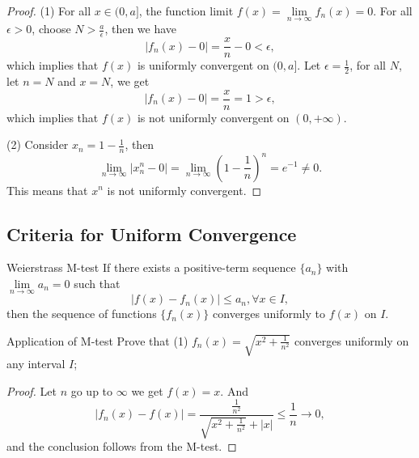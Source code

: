 \begin{proof}
  (1) For all $x \in (0, a]$, the function limit $f(x) = \lim \limits _{n
    \rightarrow \infty} f_n(x) = 0$. For all $\epsilon > 0$, choose $N >
  \frac{a}{\epsilon}$,
  then we have
  \begin{equation}
    |f_n(x) - 0| = \frac{x}{n} - 0 < \epsilon,
  \end{equation}
  which implies that $f(x)$ is uniformly convergent on $(0, a]$.
  Let $\epsilon = \frac{1}{2}$, for all $N$, let $n = N$ and $x = N$,
  we get
  \begin{equation}
    |f_n(x) - 0| = \frac{x}{n} = 1 > \epsilon,
  \end{equation}
  which implies that $f(x)$ is not uniformly convergent on $(0, +\infty)$.

  (2) Consider $x_n = 1 - \frac{1}{n}$, then
  \begin{equation}
    \lim \limits _{n \rightarrow \infty} |x_n^n - 0|
    = \lim \limits _{n \rightarrow \infty} (1 - \frac{1}{n})^n = e^{-1} \neq 0.
  \end{equation}
  This means that $x^n$ is not uniformly convergent.
\end{proof}

\subsection{Criteria for Uniform Convergence}

\begin{theorem}{Weierstrass M-test}{}
  If there exists a positive-term sequence $\{a_n\}$
  with $\lim \limits _{n \rightarrow \infty} a_n = 0$ such that
  \begin{equation}
    |f(x) - f_n(x)| \leq a_n, \forall x \in I,
  \end{equation}
  then the sequence of functions $\{f_n(x)\}$ converges uniformly to $f(x)$ on $I$.
\end{theorem}

\begin{example}{Application of M-test}{}
  Prove that
  (1) $f_n(x) = \sqrt{x^2 + \frac{1}{n^2}}$ converges uniformly on any interval $I$;
\end{example}

\begin{proof}
  Let $n$ go up to $\infty$ we get $f(x) = x$.
  And
  \begin{equation}
    |f_n(x) - f(x)| = \frac{\frac{1}{n^2}}{\sqrt{x^2 + \frac{1}{n^2}} + |x|} \leq \frac{1}{n} \rightarrow 0,
  \end{equation}
  and the conclusion follows from the M-test.
\end{proof}

